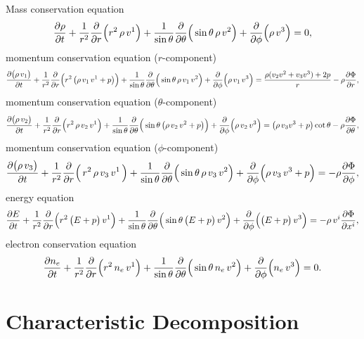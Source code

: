 \documentclass[10pt,preprint]{aastex}
\begin{document}
Mass conservation equation
\begin{equation}
  \frac{\partial \rho}{\partial t}
  +\frac{1}{r^{2}}\frac{\partial }{\partial r}\Big(r^{2}\,\rho\,v^{1}\Big)
  +\frac{1}{\sin\theta}\frac{\partial }{\partial \theta}\Big(\sin\theta\,\rho\,v^{2}\Big)
  +\frac{\partial }{\partial \phi}\Big(\rho\,v^{3}\Big)=0,
\end{equation}
momentum conservation equation ($r$-component)
\begin{equation}
  \frac{\partial \big(\rho\,v_{1}\big)}{\partial t}
  +\frac{1}{r^{2}}\frac{\partial }{\partial r}\Big(r^{2}\,\big(\rho\,v_{1}\,v^{1}+p\big)\Big)
  +\frac{1}{\sin\theta}\frac{\partial }{\partial \theta}\Big(\sin\theta\,\rho\,v_{1}\,v^{2}\Big)
  +\frac{\partial }{\partial \phi}\Big(\rho\,v_{1}\,v^{3}\Big)
  =\frac{\rho(v_{2}v^{2}+v_{3}v^{3})+2p}{r}-\rho\frac{\partial \Phi}{\partial r},
\end{equation}
momentum conservation equation ($\theta$-component)
\begin{equation}
  \frac{\partial \big(\rho\,v_{2}\big)}{\partial t}
  +\frac{1}{r^{2}}\frac{\partial }{\partial r}\Big(r^{2}\,\rho\,v_{2}\,v^{1}\Big)
  +\frac{1}{\sin\theta}\frac{\partial }{\partial \theta}\Big(\sin\theta\,\big(\rho\,v_{2}\,v^{2}+p\big)\Big)
  +\frac{\partial }{\partial \phi}\Big(\rho\,v_{2}\,v^{3}\Big)
  =\big(\rho\,v_{3}v^{3}+p\big)\cot\theta-\rho\frac{\partial \Phi}{\partial \theta},
\end{equation}
momentum conservation equation ($\phi$-component)
\begin{equation}
  \frac{\partial \big(\rho\,v_{3}\big)}{\partial t}
  +\frac{1}{r^{2}}\frac{\partial }{\partial r}\Big(\,r^{2}\,\rho\,v_{3}\,v^{1}\,\Big)
  +\frac{1}{\sin\theta}\frac{\partial }{\partial \theta}\Big(\sin\theta\,\rho\,v_{3}\,v^{2}\Big)
  +\frac{\partial }{\partial \phi}\Big(\rho\,v_{3}\,v^{3}+p\Big)
  =-\rho\frac{\partial \Phi}{\partial \phi},
\end{equation}
energy equation
\begin{equation}
  \frac{\partial E}{\partial t}
  +\frac{1}{r^{2}}\frac{\partial }{\partial r}\Big(r^{2}\,\big(E+p\big)\,v^{1}\Big)
  +\frac{1}{\sin\theta}\frac{\partial }{\partial \theta}\Big(\sin\theta\,\big(E+p\big)\,v^{2}\Big)
  +\frac{\partial }{\partial \phi}\Big(\big(E+p\big)\,v^{3}\Big)=-\rho\,v^{i}\frac{\partial \Phi}{\partial x^{i}},
\end{equation}
electron conservation equation
\begin{equation}
  \frac{\partial n_{e}}{\partial t}
  +\frac{1}{r^{2}}\frac{\partial }{\partial r}\Big(r^{2}\,n_{e}\,v^{1}\Big)
  +\frac{1}{\sin\theta}\frac{\partial }{\partial \theta}\Big(\sin\theta\,n_{e}\,v^{2}\Big)
  +\frac{\partial }{\partial \phi}\Big(n_{e}\,v^{3}\Big)=0.  
\end{equation}

\section{Characteristic Decomposition}
\label{app:Characteristic}
\end{document}
